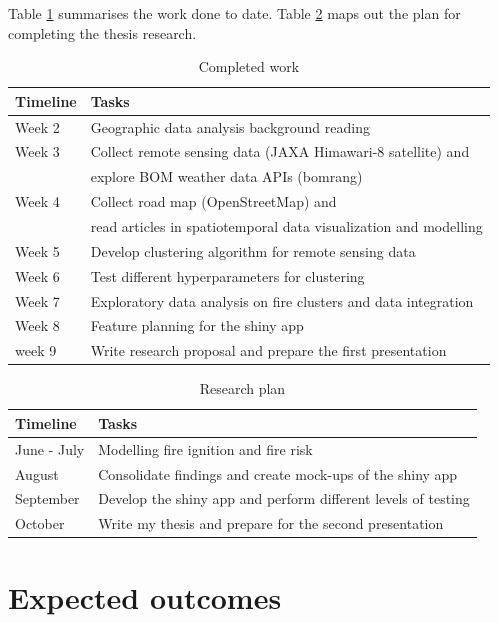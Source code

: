 \documentclass[11pt,a4paper,]{article}
\begin{document}
Table \ref{tab:timeline1} summarises the work done to date. Table \ref{tab:timeline2} maps out the plan for completing the thesis research.

\begin{table}

\caption{\label{tab:timeline1}Completed work}
\centering
\begin{tabular}[t]{ll}
\toprule
Timeline & Tasks\\
\midrule
Week 2 & Geographic data analysis background reading\\
Week 3 & Collect remote sensing data (JAXA Himawari-8 satellite) and\\
 & explore BOM weather data APIs (bomrang)\\
Week 4 & Collect road map (OpenStreetMap) and\\
 & read articles in spatiotemporal data visualization and modelling\\
\addlinespace
Week 5 & Develop clustering algorithm for remote sensing data\\
Week 6 & Test different hyperparameters for clustering\\
Week 7 & Exploratory data analysis on fire clusters and data integration\\
Week 8 & Feature planning for the shiny app\\
week 9 & Write research proposal and prepare the first presentation\\
\bottomrule
\end{tabular}
\end{table}

\begin{table}

\caption{\label{tab:timeline2}Research plan}
\centering
\begin{tabular}[t]{ll}
\toprule
Timeline & Tasks\\
\midrule
June - July & Modelling fire ignition and fire risk\\
August & Consolidate findings and create mock-ups of the shiny app\\
September & Develop the shiny app and perform different levels of testing\\
October & Write my thesis and prepare for the second presentation\\
\bottomrule
\end{tabular}
\end{table}

\hypertarget{expected-outcomes}{%
\section{Expected outcomes}\label{expected-outcomes}}
\end{document}
